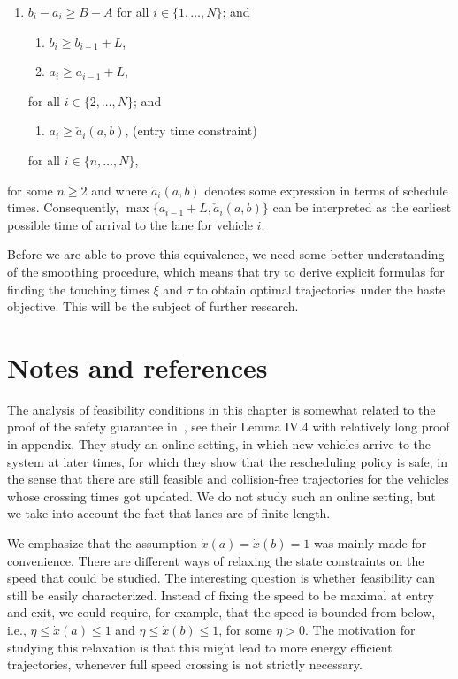 \documentclass{report}
\theoremstyle{definition}
\theoremstyle{plain}
\begin{document}
\begin{enumerate}[leftmargin=3em]
  \item[(C4)] $b_{i} - a_{i} \geq B-A$ for all $i \in \{1, \dots, N\}$; and
  \begin{enumerate}[leftmargin=4em,midpenalty=10]
    \item[(i*)\quad] $b_{i} \geq b_{i-1} + L$,
    \item[(ii*)\quad] $a_{i} \geq a_{i-1} + L$,
  \end{enumerate}
  \TabPositions{3cm}
  for all $i \in \{2, \dots, N\}$; and
  \begin{enumerate}[leftmargin=4em,midpenalty=10]
    \item[(c*)\quad] $a_{i} \geq \check{a}_i(a,b)$, \tab (entry time constraint)
  \end{enumerate}
  for all $i \in \{n, \dots, N \}$,
\end{enumerate}
for some $n \geq 2$ and where $\check{a}_{i}(a,b)$ denotes some expression in terms of
schedule times. Consequently, $\max\{a_{i-1} + L, \check{a}_{i}(a,b)\}$ can be
interpreted as the earliest possible time of arrival to the lane for vehicle
$i$.

Before we are able to prove this equivalence, we need some better understanding
of the smoothing procedure, which means that try to derive explicit formulas for
finding the touching times $\xi$ and $\tau$ to obtain optimal trajectories under
the haste objective.
%
This will be the subject of further research.


\section{Notes and references}

The analysis of feasibility conditions in this chapter is somewhat related to
the proof of the safety guarantee in~\cite{miculescuPollingsystemsbasedAutonomousVehicle2016}, see their Lemma IV.4 with
relatively long proof in appendix.
%
They study an online setting, in which new vehicles arrive to the system at
later times, for which they show that the rescheduling policy is safe, in the
sense that there are still feasible and collision-free trajectories for the
vehicles whose crossing times got updated.
%
We do not study such an online setting, but we take into account the fact that
lanes are of finite length.

We emphasize that the assumption $\dot{x}(a) = \dot{x}(b) = 1$ was mainly made
for convenience.
%
There are different ways of relaxing the state constraints on the speed that
could be studied.
%
The interesting question is whether feasibility can still be easily characterized.
%
Instead of fixing the speed to be maximal at entry and exit, we could require,
for example, that the speed is bounded from below, i.e., $\eta \leq \dot{x}(a) \leq 1$
and $\eta \leq \dot{x}(b) \leq 1$, for some $\eta > 0$.
%
The motivation for studying this relaxation is that this might lead to more
energy efficient trajectories, whenever full speed crossing is not strictly
necessary.
\end{document}

